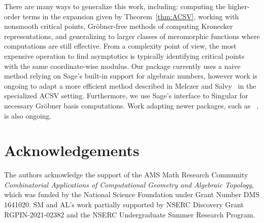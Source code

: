\documentclass[a4paper]{amsart}
\theoremstyle{definition}
\newcommand{\code}[1]{\texttt{\detokenize{#1}}}
\begin{document}
There are many ways to generalize this work, including: computing the higher-order terms in the expansion given by Theorem~\ref{thm:ACSV}, working with nonsmooth critical points, Gröbner-free methods of computing Kronecker representations, and generalizing to larger classes of meromorphic functions where computations are still effective. From a complexity point of view, the most expensive operation to find asymptotics is typically identifying critical points with the same coordinate-wise modulus. Our package currently uses a naive method relying on Sage's built-in support for algebraic numbers, however work is ongoing to adapt a more efficient method described in Melczer and Salvy~\cite{MelczerSalvy2021} in the specialized ACSV setting. Furthermore, we use Sage’s interface to Singular for necessary Gröbner basis computations. Work adapting newer packages, such as \code{msolve}~\cite{Berthomieu2021}, is also ongoing.

\section*{Acknowledgements}
The authors acknowledge the support of the AMS Math Research Community \emph{Combinatorial Applications of Computational Geometry and Algebraic Topology}, which was funded by the National Science Foundation under Grant Number DMS 1641020. SM and AL's work partially supported by NSERC Discovery Grant RGPIN-2021-02382 and the NSERC Undergraduate Summer Research Program.

\printbibliography
\end{document}
